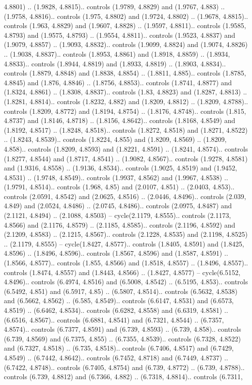 4.8801) .. (1.9828, 4.8815).. controls (1.9789, 4.8829) and (1.9767, 4.883) .. (1.9758, 4.8816).. controls (1.975, 4.8802) and (1.9724, 4.8802) .. (1.9678, 4.8815).. controls (1.963, 4.8829) and (1.9607, 4.8828) .. (1.9597, 4.8811).. controls (1.9585, 4.8793) and (1.9575, 4.8793) .. (1.9554, 4.8811).. controls (1.9523, 4.8837) and (1.9079, 4.8857) .. (1.9093, 4.8832).. controls (1.9099, 4.8824) and (1.9074, 4.8826) .. (1.9038, 4.8837).. controls (1.8953, 4.8861) and (1.8918, 4.8859) .. (1.8934, 4.8833).. controls (1.8944, 4.8819) and (1.8933, 4.8819) .. (1.8903, 4.8834).. controls (1.8879, 4.8848) and (1.8838, 4.8854) .. (1.8811, 4.885).. controls (1.8785, 4.8845) and (1.876, 4.8846) .. (1.8756, 4.8853).. controls (1.8741, 4.8877) and (1.8324, 4.8861) .. (1.8308, 4.8837).. controls (1.83, 4.8823) and (1.8287, 4.8813) .. (1.8281, 4.8814).. controls (1.8232, 4.882) and (1.8209, 4.8812) .. (1.8209, 4.8788).. controls (1.8209, 4.8772) and (1.8194, 4.8754) .. (1.8176, 4.8748).. controls (1.815, 4.8737) and (1.8146, 4.8718) .. (1.8156, 4.8642).. controls (1.8168, 4.8549) and (1.8192, 4.8517) .. (1.8248, 4.8518).. controls (1.8272, 4.8518) and (1.8271, 4.8522) .. (1.8243, 4.8539).. controls (1.8224, 4.855) and (1.8209, 4.8569) .. (1.8209, 4.858).. controls (1.8209, 4.8593) and (1.8221, 4.8591) .. (1.8241, 4.8574).. controls (1.8277, 4.8544) and (1.8717, 4.8541) .. (1.9082, 4.8567).. controls (1.9278, 4.8581) and (1.9316, 4.8558) .. (1.9136, 4.8534).. controls (1.9025, 4.8519) and (1.9452, 4.8531) .. (1.9748, 4.8549).. controls (1.9937, 4.8562) and (1.9967, 4.8538) .. (1.9791, 4.8514).. controls (1.968, 4.85) and (2.0107, 4.851) .. (2.0403, 4.853).. controls (2.0591, 4.8542) and (2.0625, 4.8516) .. (2.0446, 4.8496).. controls (2.039, 4.849) and (2.0524, 4.8486) .. (2.0745, 4.8486).. controls (2.0975, 4.8487) and (2.1121, 4.8494) .. (2.1088, 4.8503) -- cycle(2.1179, 4.8555).. controls (2.1173, 4.8566) and (2.1176, 4.8579) .. (2.1185, 4.8585).. controls (2.1196, 4.8592) and (2.1209, 4.8583) .. (2.1215, 4.8567).. controls (2.1228, 4.8535) and (2.1198, 4.8525) .. (2.1179, 4.8555) -- cycle(1.8427, 4.8577).. controls (1.8405, 4.8591) and (1.8425, 4.8596) .. (1.8496, 4.8596).. controls (1.8567, 4.8596) and (1.8587, 4.8591) .. (1.8566, 4.8577).. controls (1.855, 4.8566) and (1.8518, 4.8557) .. (1.8496, 4.8557).. controls (1.8474, 4.8557) and (1.8443, 4.8566) .. (1.8427, 4.8577) -- cycle(6.5152, 4.8496).. controls (6.4974, 4.8516) and (6.5008, 4.8542) .. (6.5195, 4.853).. controls (6.5492, 4.851) and (6.5917, 4.85) .. (6.5807, 4.8514).. controls (6.5632, 4.8538) and (6.5662, 4.8562) .. (6.585, 4.8549).. controls (6.6147, 4.8531) and (6.6573, 4.8519) .. (6.6462, 4.8534).. controls (6.6282, 4.8558) and (6.6319, 4.8581) .. (6.6516, 4.8567).. controls (6.6881, 4.8541) and (6.7321, 4.8544) .. (6.7357, 4.8574).. controls (6.7377, 4.8591) and (6.739, 4.8593) .. (6.739, 4.858).. controls (6.739, 4.8569) and (6.7375, 4.855) .. (6.7355, 4.8539).. controls (6.7328, 4.8522) and (6.7327, 4.8518) .. (6.735, 4.8518).. controls (6.7406, 4.8517) and (6.7429, 4.8549) .. (6.7442, 4.8642).. controls (6.7452, 4.8718) and (6.7449, 4.8737) .. (6.7422, 4.8748).. controls (6.7405, 4.8754) and (6.739, 4.8772) .. (6.739, 4.8788).. controls (6.739, 4.8812) and (6.7366, 4.882) .. (6.7318, 4.8814).. controls (6.7311, 